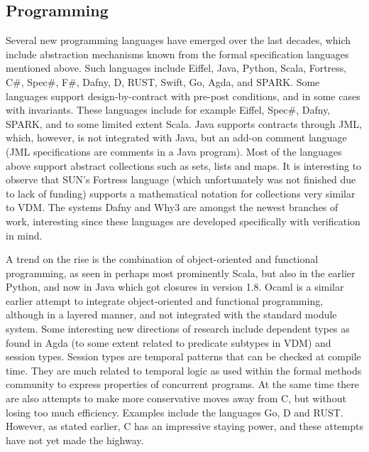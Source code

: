 \subsection{Programming}

Several new programming languages have emerged over the last 
decades, which include abstraction mechanisms known from the formal 
specification languages mentioned above. Such languages include 
Eiffel, Java, Python, Scala, Fortress,  C\#, Spec\#, F\#,  Dafny, D, 
RUST, Swift, Go, Agda, and SPARK.  Some languages support 
design-by-contract with pre-post conditions, and in some cases with 
invariants. These languages  include for example Eiffel, Spec\#, 
Dafny, SPARK, and to some limited extent Scala. Java supports 
contracts through JML, which, however, is not integrated with Java, 
but an add-on comment language (JML specifications are comments in 
a Java program). Most of the languages above support abstract 
collections such as sets, lists and maps. It is interesting to 
observe that SUN’s Fortress language (which unfortunately was not 
finished due to lack of funding) supports a mathematical 
notation for collections very similar to VDM. The systems 
Dafny and Why3 are amongst the newest branches of work, 
interesting since these languages are developed 
specifically with verification in mind.

A trend on the rise is the combination of object-oriented 
and functional programming, as seen in perhaps most prominently 
Scala, but also in the earlier Python, and now in Java which got 
closures in version 1.8.  Ocaml is a similar earlier attempt to 
integrate object-oriented and functional programming, although in a 
layered manner, and not integrated with the standard module system. 
Some interesting new directions of research include dependent types 
as found in Agda (to some extent related to predicate subtypes in 
VDM) and session types. Session types are temporal patterns that 
can be checked at compile time. They are much related to temporal 
logic as used within the formal methods community to express 
properties of concurrent programs. At the same time there are also 
attempts to make more conservative moves away from C, but without 
losing too much efficiency. Examples include the languages Go, D and RUST. However, as stated earlier, C has an impressive staying power, and these attempts have not yet made the highway.

